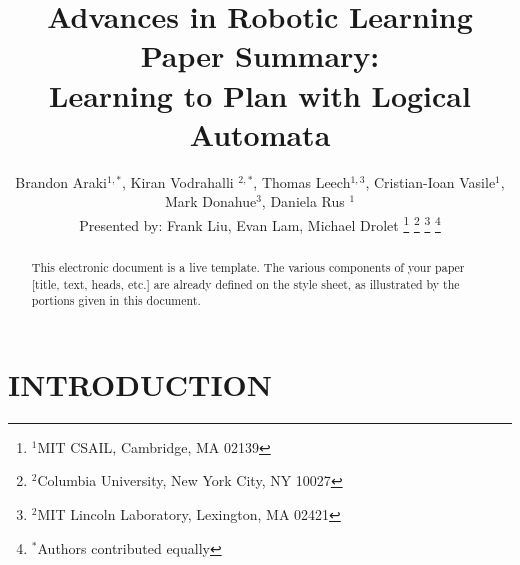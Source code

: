 \documentclass[letterpaper, 10 pt, conference]{ieeeconf}  %
\title{\LARGE \bf
Advances in Robotic Learning Paper Summary: \\
Learning to Plan with Logical Automata
}
\author{Brandon Araki$^{1,*}$, Kiran Vodrahalli $^{2,*}$, Thomas Leech$^{1,3}$, Cristian-Ioan Vasile$^{1}$, Mark Donahue$^{3}$, Daniela Rus $^{1}$ \\
Presented by: Frank Liu, Evan Lam, Michael Drolet
\thanks{$^{1}$MIT CSAIL, Cambridge, MA 02139}%
\thanks{$^{2}$Columbia University, New York City, NY 10027 }%
\thanks{$^{2}$MIT Lincoln Laboratory, Lexington, MA 02421}%
\thanks{$^{*}$Authors contributed equally}%
}
\begin{document}
\maketitle
\thispagestyle{empty}
\pagestyle{empty}


\begin{abstract}

This electronic document is a live template. The various components of your paper [title, text, heads, etc.] are already defined on the style sheet, as illustrated by the portions given in this document.

\end{abstract}


\section{INTRODUCTION}
\end{document}

